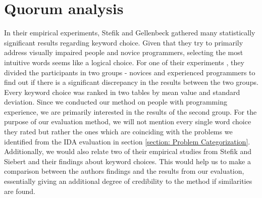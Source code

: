 \section{Quorum analysis}
In their empirical experiments, Stefik and Gellenbeck \cite{EmpStudiesonStimuli} gathered many statistically significant results regarding keyword choice. Given that they try to primarily address visually impaired people and novice programmers, selecting the most intuitive words seems like a logical choice. For one of their  experiments \cite{EmpStudiesonStimuli}, they divided the participants in two groups - novices and experienced programmers to find out if there is a significant discrepancy in the results between the two groups. Every keyword choice was ranked in two tables by mean value and standard deviation. Since we conducted our method on people with programming experience, we are primarily interested in the results of the second group. For the purpose of our evaluation method, we will not mention every single word choice they rated but rather the ones which are coinciding with the problems we identified from the IDA evaluation in section \ref{section: Problem Categorization}. Additionally, we would also relate two of their empirical studies from Stefik and Siebert \cite{Empiricalinvestigation} and their findings about keyword choices. This would help us to make a comparison between the authors findings and the results from our evaluation, essentially giving an additional degree of credibility to the method if similarities are found.

